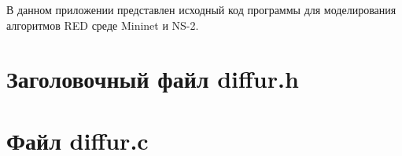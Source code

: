 
В данном приложении представлен исходный код программы для моделирования алгоритмов RED среде Mininet и NS-2.


\chapter{Заголовочный файл diffur.h}
\label{app3:1}




\chapter{Файл diffur.c}
\label{app3:2}




